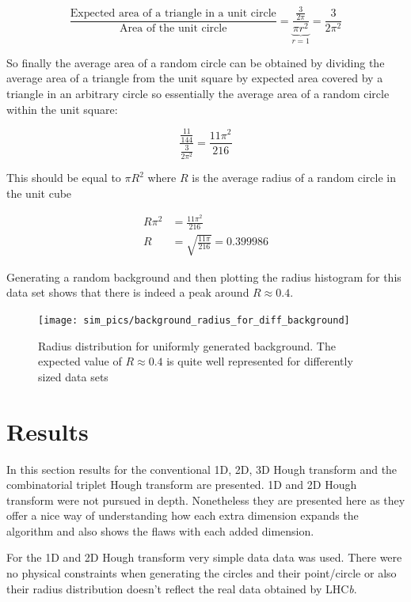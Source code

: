 \documentclass[11pt,twoside]{scrreprt}
\begin{document}
\[
\frac{\text{Expected area of a triangle in a unit circle}}{\text{Area of the unit circle}} = \underbrace{\frac{\frac{3}{2\pi}}{\pi r^2}}_{r=1} = \frac{3}{2\pi^2}
\]

So finally the average area of a random circle can be obtained by dividing the average area of a triangle from the unit square by expected
area covered by a triangle in an arbitrary circle so essentially the average area of a random circle within the unit square:

\[
  \frac{\frac{11}{144}}{\frac{3}{2\pi^2}} = \frac{11\pi^2}{216}
\]

This should be equal to $\pi R^2$ where $R$ is the average radius of a random circle in the unit cube

\begin{align}
  R\pi^2 &= \frac{11\pi^2}{216}\nonumber\\
  R &= \sqrt{\frac{11\pi}{216}} = 0.399986\nonumber
\end{align}

Generating a random background and then plotting the radius histogram for this data set shows that there is indeed a peak around
 $R\approx 0.4$.

 \begin{figure}[tb]
   \centering
   \texttt{[image: sim\_pics/background\_radius\_for\_diff\_background]}
   \caption[Radius distribution for background]{Radius distribution for uniformly generated background. The expected value of $R\approx 0.4$
   is quite well represented for differently sized data sets}
   \label{fig:rad_dist}
 \end{figure}

\chapter{Results}
\label{cha:results}
In this section results for the conventional 1D, 2D, 3D Hough transform and the combinatorial triplet Hough transform are presented. 1D and 2D Hough transform
were not pursued in depth. Nonetheless they are presented here as they offer a nice
way of understanding how each extra dimension expands the algorithm and also
shows the flaws with each added dimension.

For the 1D and 2D Hough transform very simple data data was used. There were 
no physical constraints when generating the circles and their point/circle
or also their radius distribution doesn't reflect the real data obtained
by LHC\textit{b}.
\end{document}
